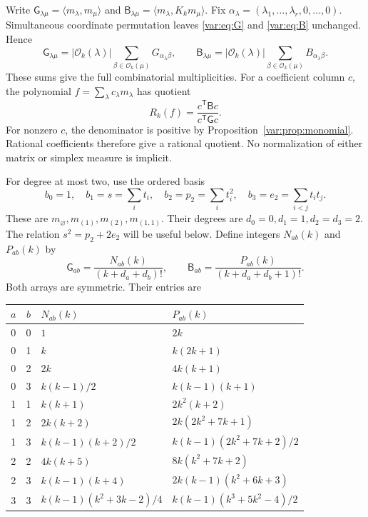 \documentclass[11pt]{article}
\newcommand{\ip}[2]{\langle #1,#2\rangle}
\begin{document}
Write $\mathsf G_{\lambda\mu}=\ip{m_\lambda}{m_\mu}$ and
$\mathsf B_{\lambda\mu}=\ip{m_\lambda}{K_km_\mu}$.
Fix $\alpha_\lambda=(\lambda_1,\ldots,\lambda_r,0,\ldots,0)$.
Simultaneous coordinate permutation leaves \eqref{var:eq:G} and
\eqref{var:eq:B} unchanged.  Hence
\begin{equation}\label{var:eq:orbit-sum}
 \mathsf G_{\lambda\mu}
  =|\mathcal O_k(\lambda)|\sum_{\beta\in\mathcal O_k(\mu)}
                             G_{\alpha_\lambda\beta},\qquad
 \mathsf B_{\lambda\mu}
  =|\mathcal O_k(\lambda)|\sum_{\beta\in\mathcal O_k(\mu)}
                             B_{\alpha_\lambda\beta}.
\end{equation}
These sums give the full combinatorial multiplicities.
For a coefficient column $c$, the polynomial $f=\sum_\lambda c_\lambda m_\lambda$
has quotient
\begin{equation}\label{var:eq:matrix-quotient}
 R_k(f)=\frac{c^{\mathsf T}\mathsf Bc}{c^{\mathsf T}\mathsf Gc}.
\end{equation}
For nonzero $c$, the denominator is positive by
Proposition~\ref{var:prop:monomial}.
Rational coefficients therefore give a rational quotient.
No normalization of either matrix or simplex measure is implicit.

For degree at most two, use the ordered basis
\begin{equation}\label{var:eq:basis}
 b_0=1,\quad b_1=s=\sum_i t_i,\quad
 b_2=p_2=\sum_i t_i^2,\quad
 b_3=e_2=\sum_{i<j}t_it_j.
\end{equation}
These are $m_{\varnothing},m_{(1)},m_{(2)},m_{(1,1)}$.
Their degrees are $d_0=0,d_1=1,d_2=d_3=2$.
The relation $s^2=p_2+2e_2$ will be useful below.
Define integers $N_{ab}(k)$ and $P_{ab}(k)$ by
\begin{equation}\label{var:eq:quadratic-matrices}
 \mathsf G_{ab}=\frac{N_{ab}(k)}{(k+d_a+d_b)!},\qquad
 \mathsf B_{ab}=\frac{P_{ab}(k)}{(k+d_a+d_b+1)!}.
\end{equation}
Both arrays are symmetric.  Their entries are
\begin{center}
\begin{tabular}{ccll}
\toprule
$a$&$b$&$N_{ab}(k)$&$P_{ab}(k)$\\
\midrule
0&0&$1$&$2k$\\
0&1&$k$&$k(2k+1)$\\
0&2&$2k$&$4k(k+1)$\\
0&3&$k(k-1)/2$&$k(k-1)(k+1)$\\
1&1&$k(k+1)$&$2k^2(k+2)$\\
1&2&$2k(k+2)$&$2k(2k^2+7k+1)$\\
1&3&$k(k-1)(k+2)/2$&$k(k-1)(2k^2+7k+2)/2$\\
2&2&$4k(k+5)$&$8k(k^2+7k+2)$\\
2&3&$k(k-1)(k+4)$&$2k(k-1)(k^2+6k+3)$\\
3&3&$k(k-1)(k^2+3k-2)/4$&$k(k-1)(k^3+5k^2-4)/2$\\
\bottomrule
\end{tabular}
\end{center}
\end{document}
